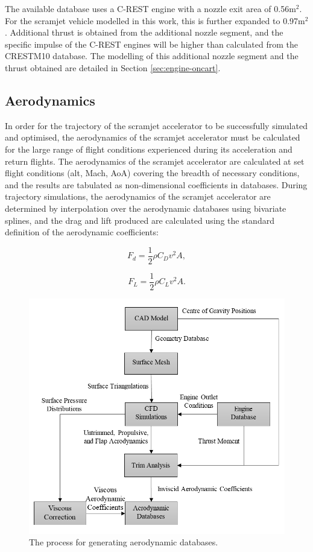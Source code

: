 The available database uses a C-REST engine with a nozzle exit area of 0.56m$^2$. For the scramjet vehicle modelled in this work, this is further expanded to 0.97m$^2$. Additional thrust is obtained from the additional nozzle segment, and the specific impulse of the C-REST engines will be higher than calculated from the \textsf{CRESTM10} database. The modelling of this additional nozzle segment and the thrust obtained are detailed in Section \ref{sec:engine-oncart}.






		
		
		\subsection{Aerodynamics}\label{sec:aero}
		
		
		
In order for the trajectory of the scramjet accelerator to be successfully simulated and optimised, the aerodynamics of the scramjet accelerator must be calculated for the large range of flight conditions experienced during its acceleration and return flights. 
The aerodynamics of the scramjet accelerator are calculated at set flight conditions (alt, Mach, AoA) covering the breadth of necessary conditions, and the results are tabulated as non-dimensional coefficients in databases. During trajectory simulations, the aerodynamics of the scramjet accelerator are determined by interpolation over the aerodynamic databases using bivariate splines, and the drag and lift produced are calculated using the standard definition of the aerodynamic coefficients:

\begin{equation}
F_d = \frac{1}{2}\rho C_D v^2 A ,
\end{equation}

\begin{equation}
F_L = \frac{1}{2}\rho C_L v^2 A .
\end{equation}


\begin{figure}[ht]
	\centering
	\includegraphics[width=0.7\linewidth]{figures/3_vehicle_design/FlowChart}
	\caption{The process for generating aerodynamic databases.}
	\label{fig:FlowChart}
\end{figure}

